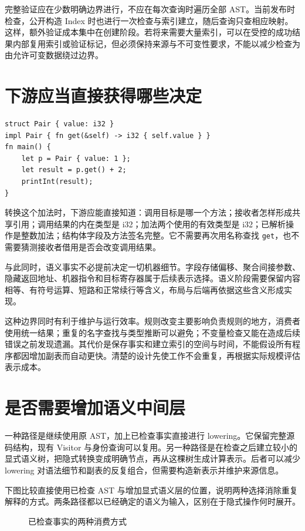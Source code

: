 完整验证应在少数明确边界进行，不应在每次查询时遍历全部 AST。当前发布时检查，公开构造 Index 时也进行一次检查与索引建立，随后查询只查相应映射。这样，额外验证成本集中在创建阶段。若将来需要大量索引，可以在受控的成功结果内部复用索引或验证标记，但必须保持来源与不可变性要求，不能以减少检查为由允许可变数据绕过边界。

\section{下游应当直接获得哪些决定}
\begin{lstlisting}[language=Rustless]
struct Pair { value: i32 }
impl Pair { fn get(&self) -> i32 { self.value } }
fn main() {
    let p = Pair { value: 1 };
    let result = p.get() + 2;
    printInt(result);
}
\end{lstlisting}
转换这个加法时，下游应能直接知道：调用目标是哪一个方法；接收者怎样形成共享引用；调用结果的内在类型是 i32；加法两个使用的有效类型是 i32；已解析操作是整数加法；结构体字段及方法签名完整。它不需要再次用名称查找 \lstinline[language=Rustless]|get|，也不需要猜测接收者借用是否会改变调用结果。

与此同时，语义事实不必提前决定一切机器细节。字段存储偏移、聚合间接参数、隐藏返回地址、机器指令和目标寄存器属于后续表示选择。语义阶段需要保留内容相等、有符号运算、短路和正常续行等含义，布局与后端再依据这些含义形成实现。

这种边界同时有利于维护与运行效率。规则改变主要影响负责规则的地方，消费者使用统一结果；重复的名字查找与类型推断可以避免；不变量检查又能在造成后续错误之前发现遗漏。其代价是保存事实和建立索引的空间与时间，不能假设所有程序都因增加副表而自动更快。清楚的设计先使工作不会重复，再根据实际规模评估表示成本。

\section{是否需要增加语义中间层}
一种路径是继续使用原 AST，加上已检查事实直接进行 lowering。它保留完整源码结构，现有 Visitor 与身份查询可以复用。另一种路径是在检查之后建立较小的显式语义树，把隐式转换变成明确节点，再从这棵树生成计算表示。后者可以减少 lowering 对语法细节和副表的反复组合，但需要构造新表示并维护来源信息。

下图比较直接使用已检查 AST 与增加显式语义层的位置，说明两种选择消除重复解释的方式。两条路径都以已经确定的语义为输入，区别在于隐式操作何时展开。
\begin{figure}[htbp]
\centering
{}
\caption{已检查事实的两种消费方式}
\end{figure}

